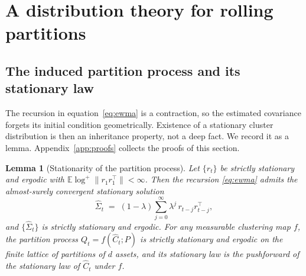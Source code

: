 \documentclass[11pt]{article}
\newtheorem{lemma}{Lemma}
\theoremstyle{remark}
\newcommand{\E}{\mathbb{E}}
\begin{document}
\section{A distribution theory for rolling partitions}
\label{sec:theory}


\subsection{The induced partition process and its stationary law}

The recursion in equation~\eqref{eq:ewma} is a contraction, so the estimated
covariance forgets its initial condition geometrically. Existence of a
stationary cluster distribution is then an inheritance property, not a deep
fact. We record it as a lemma. Appendix~\ref{app:proofs} collects the proofs
of this section.

\begin{lemma}[Stationarity of the partition process]
\label{lem:stationarity}
Let $\{r_t\}$ be strictly stationary and ergodic with
$\E \log^{+} \| r_1 r_1^{\top} \| < \infty$. Then the recursion
\eqref{eq:ewma} admits the almost-surely convergent stationary solution
\begin{equation}
\widehat{\Sigma}_t \;=\; (1-\lambda) \sum_{j=0}^{\infty} \lambda^{j}\,
r_{t-j} r_{t-j}^{\top},
\label{eq:stationarysol}
\end{equation}
and $\{\widehat{\Sigma}_t\}$ is strictly stationary and ergodic. For any
measurable clustering map $f$, the partition process
$Q_t = f(\widehat{C}_t; P)$ is strictly stationary and ergodic on the finite
lattice of partitions of $d$ assets, and its stationary law is the pushforward
of the stationary law of $\widehat{C}_t$ under $f$.
\end{lemma}
\end{document}
